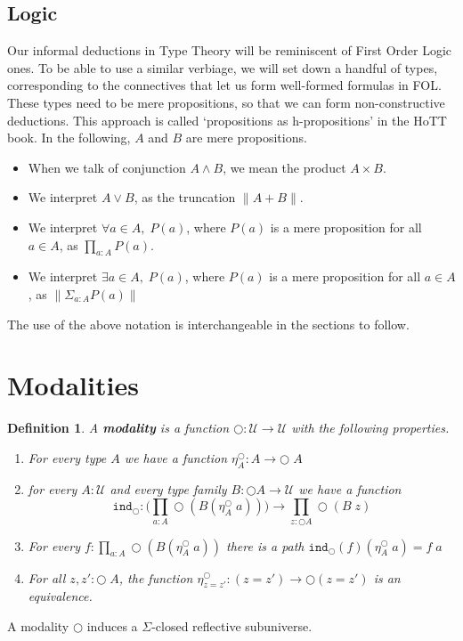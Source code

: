 \documentclass[12pt]{article}
\newtheorem{defn}[thm]{Definition}
\begin{document}
\subsection{Logic}
Our informal deductions in Type Theory will be reminiscent of First Order Logic ones. 
To be able to use a similar verbiage, we will set down a handful of types, corresponding to the connectives that let us form well-formed formulas in FOL. 
These types need to be mere propositions, so that we can form non-constructive deductions. 
This approach is called `propositions as h-propositions' in the HoTT book. 
In the following, $A$ and $B$ are mere propositions.
\begin{itemize}
\item When we talk of conjunction $A \wedge B$, we mean the product $A \times B$. 
\item We interpret $A \vee B$, as the truncation $\| A + B\|$.
\item We interpret $\forall a\in A,\; P(a)$, where $P(a)$ is a mere proposition for all $a \in A$, as $\prod_{a : A}P(a)$. 
\item We interpret $ \exists a \in A,\; P(a)$, where $P(a)$ is a mere proposition for all $a \in A$, as $\| \Sigma_{a : A} P(a) \|$
\end{itemize}
The use of the above notation is interchangeable in the sections to follow.


\section{Modalities}
\begin{defn}
A \textbf{modality} is a function $\bigcirc : \mathcal{U} \rightarrow \mathcal{U}$ with the following properties.
\begin{enumerate}
	\item For every type $A$ we have a function $\eta_A^\bigcirc : A \rightarrow \bigcirc\; A$
	\item for every $A : \mathcal{U}$ and every type family $B : \bigcirc A \rightarrow \mathcal{U}$ we have a function
	$$\mathtt{ind}_\bigcirc : \Big( \prod_{a : A}\bigcirc (B (\eta_A^\bigcirc\; a)) \Big) \rightarrow \prod_{z : \bigcirc A} \bigcirc (B\; z)$$
	\item For every $f : \prod_{a : A} \bigcirc (B(\eta_A^\bigcirc\; a))$ there is a path $\mathtt{ind}_\bigcirc (f)(\eta_A^\bigcirc\; a) = f\; a$
	\item For all $z,z' : \bigcirc \; A$, the function $\eta_{z=z'}^\bigcirc : (z = z') \rightarrow \bigcirc (z = z')$ is an equivalence.

\end{enumerate}
\end{defn}
A modality $\bigcirc$ induces a $\Sigma$-closed reflective subuniverse.
\end{document}

